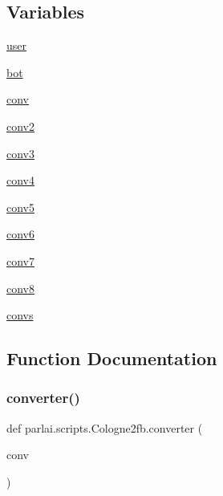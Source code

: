 \subsection*{Variables}
\begin{DoxyCompactItemize}
\item 
\hyperlink{namespaceparlai_1_1scripts_1_1Cologne2fb_a2c2775ea3b77b08039c44de9db5e2302}{user}
\item 
\hyperlink{namespaceparlai_1_1scripts_1_1Cologne2fb_a2daa0c10243dae832a8f536c1af3f401}{bot}
\item 
\hyperlink{namespaceparlai_1_1scripts_1_1Cologne2fb_a9cdaab7c6b5d02bcf42de03da00fa817}{conv}
\item 
\hyperlink{namespaceparlai_1_1scripts_1_1Cologne2fb_a5cc1bac96c382d42d0de484c9a132afa}{conv2}
\item 
\hyperlink{namespaceparlai_1_1scripts_1_1Cologne2fb_a6f6c61af667625808d3554bc1a8cac7b}{conv3}
\item 
\hyperlink{namespaceparlai_1_1scripts_1_1Cologne2fb_af399596e05aa1c02f7cc74cb8b449861}{conv4}
\item 
\hyperlink{namespaceparlai_1_1scripts_1_1Cologne2fb_acdf2c80ef97e5b6e69ea92d38484445e}{conv5}
\item 
\hyperlink{namespaceparlai_1_1scripts_1_1Cologne2fb_aee103b86f514b05352951131adbc0971}{conv6}
\item 
\hyperlink{namespaceparlai_1_1scripts_1_1Cologne2fb_a6d3a522854ceb9dbba1b0f043af8b9fb}{conv7}
\item 
\hyperlink{namespaceparlai_1_1scripts_1_1Cologne2fb_a960be2b5161d03a0d299f271df580d8a}{conv8}
\item 
\hyperlink{namespaceparlai_1_1scripts_1_1Cologne2fb_aa6c7de7860100333b7a5b24578491867}{convs}
\end{DoxyCompactItemize}


\subsection{Function Documentation}
\mbox{\label{namespaceparlai_1_1scripts_1_1Cologne2fb_a1600997b7fde85c597ea9ec986997276}} 
\subsubsection{\texorpdfstring{converter()}{converter()}}
{\footnotesize\ttfamily def parlai.\+scripts.\+Cologne2fb.\+converter (\begin{DoxyParamCaption}\item[{}]{conv }\end{DoxyParamCaption})}



